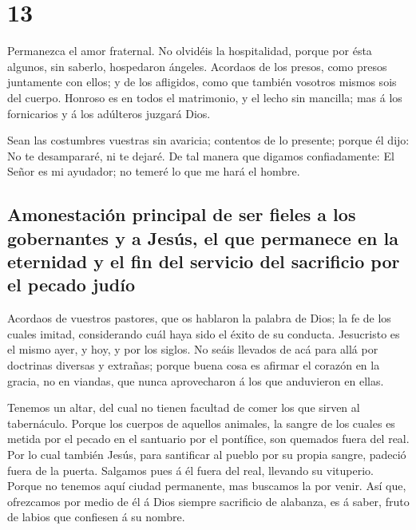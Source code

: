 \hypertarget{section-12}{%
\section{13}\label{section-12}}

 Permanezca el amor fraternal.  No olvidéis la
hospitalidad, porque por ésta algunos, sin saberlo, hospedaron ángeles.
 Acordaos de los presos, como presos juntamente con ellos; y
de los afligidos, como que también vosotros mismos sois del cuerpo.
 Honroso es en todos el matrimonio, y el lecho sin mancilla;
mas á los fornicarios y á los adúlteros juzgará Dios.

 Sean las costumbres vuestras sin avaricia; contentos de lo
presente; porque él dijo: No te desampararé, ni te dejaré. 
De tal manera que digamos confiadamente: El Señor es mi ayudador; no
temeré lo que me hará el hombre.

\hypertarget{amonestaciuxf3n-principal-de-ser-fieles-a-los-gobernantes-y-a-jesuxfas-el-que-permanece-en-la-eternidad-y-el-fin-del-servicio-del-sacrificio-por-el-pecado-juduxedo}{%
\subsection{Amonestación principal de ser fieles a los gobernantes y a
Jesús, el que permanece en la eternidad y el fin del servicio del
sacrificio por el pecado
judío}\label{amonestaciuxf3n-principal-de-ser-fieles-a-los-gobernantes-y-a-jesuxfas-el-que-permanece-en-la-eternidad-y-el-fin-del-servicio-del-sacrificio-por-el-pecado-juduxedo}}

 Acordaos de vuestros pastores, que os hablaron la palabra
de Dios; la fe de los cuales imitad, considerando cuál haya sido el
éxito de su conducta.  Jesucristo es el mismo ayer, y hoy, y
por los siglos.  No seáis llevados de acá para allá por
doctrinas diversas y extrañas; porque buena cosa es afirmar el corazón
en la gracia, no en viandas, que nunca aprovecharon á los que anduvieron
en ellas.

 Tenemos un altar, del cual no tienen facultad de comer los
que sirven al tabernáculo.  Porque los cuerpos de aquellos
animales, la sangre de los cuales es metida por el pecado en el
santuario por el pontífice, son quemados fuera del real. 
Por lo cual también Jesús, para santificar al pueblo por su propia
sangre, padeció fuera de la puerta.  Salgamos pues á él
fuera del real, llevando su vituperio.  Porque no tenemos
aquí ciudad permanente, mas buscamos la por venir.  Así
que, ofrezcamos por medio de él á Dios siempre sacrificio de alabanza,
es á saber, fruto de labios que confiesen á su nombre.

